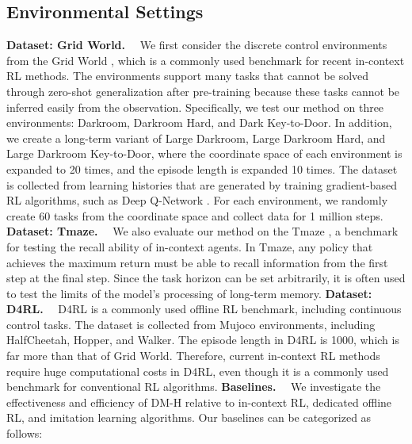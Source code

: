 \documentclass{article}
\begin{document}
\subsection{Environmental Settings}
\label{Environmental Settings}
\noindent\textbf{Dataset: Grid World.}~~
We first consider the discrete control environments from the Grid World \cite{14}, which is a commonly used benchmark for recent in-context RL methods. The environments support many tasks that cannot be solved through zero-shot generalization after pre-training because these tasks cannot be inferred easily from the observation. Specifically, we test our method on three environments: Darkroom, Darkroom Hard, and Dark Key-to-Door. In addition, we create a long-term variant of Large Darkroom, Large Darkroom Hard, and Large Darkroom Key-to-Door, where the coordinate space of each environment is expanded to 20 times, and the episode length is expanded 10 times. The dataset is collected from learning histories that are generated by training gradient-based RL algorithms, such as Deep Q-Network \cite{28}. For each environment, we randomly create 60 tasks from the coordinate space and collect data for 1 million steps.
\noindent\textbf{Dataset: Tmaze.}~~
We also evaluate our method on the Tmaze \cite{19}, a benchmark for testing the recall ability of in-context agents. In Tmaze, any policy that achieves the maximum return must be able to recall information from the first step at the final step. Since the task horizon can be set arbitrarily, it is often used to test the limits of the model's processing of long-term memory.
\noindent\textbf{Dataset: D4RL.}~~
D4RL \cite{13} is a commonly used offline RL benchmark, including continuous control tasks.
The dataset is collected from Mujoco environments, including HalfCheetah, Hopper, and Walker. The episode length in D4RL is 1000, which is far more than that of Grid World. Therefore, current in-context RL methods require huge computational costs in D4RL, even though it is a commonly used benchmark for conventional RL algorithms.
\noindent\textbf{Baselines.}~~
We investigate the effectiveness and efficiency of DM-H relative to in-context RL, dedicated offline RL, and imitation learning algorithms. Our baselines can be categorized as follows:
\end{document}
